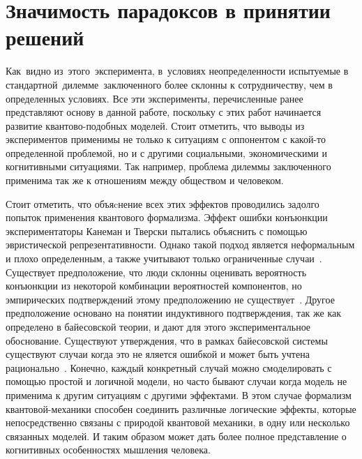 \section{Значимость парадоксов в принятии решений}

Как~видно из~этого~эксперимента, в~условиях неопределенности испытуемые в стандартной~дилемме~заключенного
более склонны к сотрудничеству, чем в определенных условиях. Все эти эксперименты, перечисленные ранее
представляют основу в данной работе, поскольку с этих работ начинается развитие квантово-подобных моделей.
Стоит отметить, что выводы из экспериментов применимы не только к ситуациям с оппонентом с какой-то
определенной проблемой, но и с другими социальными, экономическими и когнитивными ситуациями. Так например,
проблема дилеммы заключенного применима так же к отношениям между обществом и человеком.

Стоит отметить, что объяcнение всех этих эффектов проводились задолго попыток применения квантового формализма.
Эффект ошибки конъюнкции экспериментаторы Канеман и Тверски пытались объяснить с помощью эвристической
репрезентативности. Однако такой подход является неформальным и плохо определенным, а также учитывают
только ограниченные случаи~\citep{shafffi1990typicality,massaro1994pattern,gigerenzer1996narrow}.
Существует предположение, что люди склонны оценивать вероятность конъюнкции из некоторой комбинации
вероятностей компонентов, но эмпирических подтверждений этому предположению не существует~\citep{tentori2013determinants}.
Другое предположение основано на понятии индуктивного подтверждения, так же как определено в байесовской
теории, и дают для этого экспериментальное обоснование. Существуют утверждения, что в рамках байесовской
системы существуют случаи когда это не яляется ошибкой и может быть учтена рационально~\citep{von2011bayesian,hintikka2004fallacious}.
Конечно, каждый конкретный случай можно смоделировать с помощью простой и логичной модели, но часто
бывают случаи когда модель не применима к другим ситуациям с другими эффектами. В этом случае формализм
квантовой-механики способен соединить различные логические эффекты, которые непосредственно связаны с природой
квантовой механики, в одну или несколько связанных моделей. И таким образом может дать более полное
представление о когнитивных особенностях мышления человека.